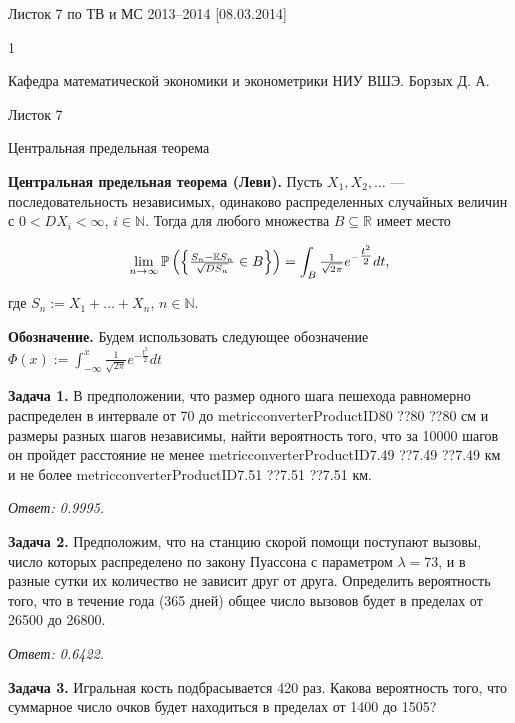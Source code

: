 









Листок 7 по ТВ и МС 2013--2014 [08.03.2014]







1

Кафедра математической экономики и эконометрики НИУ ВШЭ. Борзых Д. А.

Листок 7

Центральная предельная теорема



\textbf{Центральная предельная теорема (Леви).} Пусть $X_{1} ,X_{2} ,\ldots $ --- последовательность независимых, одинаково распределенных случайных величин с $0<DX_{i} <\infty $, $i\in {\mathbb N}$. Тогда для любого множества $B\subseteq {\mathbb R}$ имеет место

\[\mathop{\lim }\limits_{n\to \infty } {\rm {\mathbb P}}\left(\left\{{\tfrac{S_{n} -{\rm {\mathbb E}}S_{n} }{\sqrt{DS_{n} } }} \in B\right\}\right)=\int _{B}{\tfrac{1}{\sqrt{2\pi } }} e^{-{\tfrac{t^{2} }{2}} } dt ,\] 

где $S_{n} :=X_{1} +\ldots +X_{n} $, $n\in {\mathbb N}$.

\textbf{Обозначение.} Будем использовать следующее обозначение $\Phi (x):=\int _{-\infty }^{x}{\tfrac{1}{\sqrt{2\pi } }} e^{-{\tfrac{t^{2} }{2}} } dt $

\textbf{Задача 1. }В предположении, что размер одного шага пешехода равномерно распределен в интервале от 70 до metricconverterProductID80 ??80 ??80 см и размеры разных шагов независимы, найти вероятность того, что за 10000 шагов он пройдет расстояние не менее metricconverterProductID7.49 ??7.49 ??7.49 км и не более metricconverterProductID7.51 ??7.51 ??7.51 км. 

\textit{Ответ: 0.9995.}



\textbf{Задача 2. }Предположим, что на станцию скорой помощи поступают вызовы, число которых распределено по закону Пуассона с параметром $\lambda =73$, и в разные сутки их количество не зависит друг от друга. Определить вероятность того, что в течение года (365 дней) общее число вызовов будет в пределах от 26500 до 26800. 

\textit{Ответ: 0.6422.}



\textbf{Задача 3. }Игральная кость подбрасывается 420 раз. Какова вероятность того, что суммарное число очков будет находиться в пределах от 1400 до 1505? 

